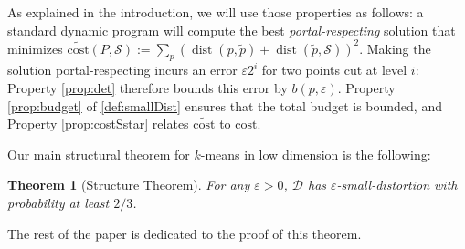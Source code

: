 \documentclass[11pt]{article}
\newtheorem{theorem}{Theorem}[section]
\newcommand{\eps}{\varepsilon}
\newcommand{\cost}{\mathrm{cost}}
\renewcommand{\tilde}{\widetilde}
\newcommand{\calD}{\mathcal {D}}
\newcommand{\calS}{\mathcal {S}}
\DeclareMathOperator{\dist}{dist}
\begin{document}
As explained in the introduction, we will use those properties as follows: a standard dynamic program will compute the best \emph{portal-respecting} solution that minimizes $\tilde{\cost}(P, \calS) := \sum_p (\dist(p, \tilde p) + \dist(\tilde p, \calS))^2$. Making the solution portal-respecting incurs an error $\eps 2^i$ for two points cut at level $i$: Property \ref{prop:det} therefore bounds this error by $b(p, \eps)$. Property \ref{prop:budget} of \cref{def:smallDist} ensures that the total budget is bounded, and Property \ref{prop:costSstar} relates $\tilde{ \cost}$ to $\cost$.

Our main structural theorem for $k$-means in low dimension is the following:

\begin{theorem}[Structure Theorem]\label{thm:smallDist}
    For any $\eps > 0$, $\calD$ has $\eps$-small-distortion with probability at least $2/3$.
\end{theorem}
The rest of the paper is dedicated to the proof of this theorem.
\end{document}
